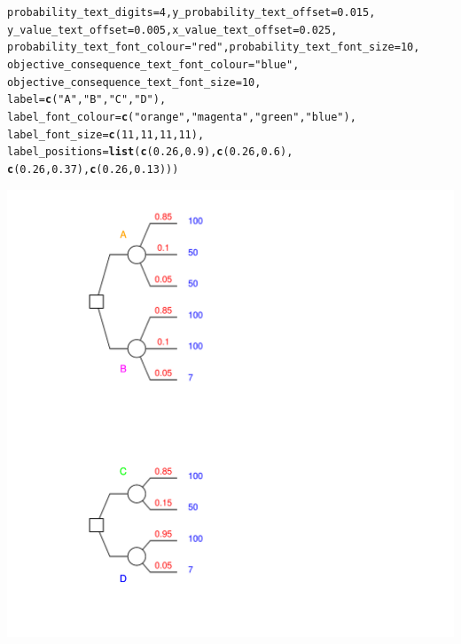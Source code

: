 \documentclass{article}\usepackage[]{graphicx}\usepackage[]{color}
\makeatletter
\newcommand{\hlnum}[1]{\textcolor[rgb]{0.686,0.059,0.569}{#1}}%
\newcommand{\hlstr}[1]{\textcolor[rgb]{0.192,0.494,0.8}{#1}}%
\newcommand{\hlstd}[1]{\textcolor[rgb]{0.345,0.345,0.345}{#1}}%
\newcommand{\hlkwc}[1]{\textcolor[rgb]{0.333,0.667,0.333}{#1}}%
\newcommand{\hlkwd}[1]{\textcolor[rgb]{0.737,0.353,0.396}{\textbf{#1}}}%
\newenvironment{kframe}{%
 \def\at@end@of@kframe{}%
 \ifinner\ifhmode%
  \def\at@end@of@kframe{\end{minipage}}%
  \begin{minipage}{\columnwidth}%
 \fi\fi%
 \def\FrameCommand##1{\hskip\@totalleftmargin \hskip-\fboxsep
 \colorbox{shadecolor}{##1}\hskip-\fboxsep
     \hskip-\linewidth \hskip-\@totalleftmargin \hskip\columnwidth}%
 \MakeFramed {\advance\hsize-\width
   \@totalleftmargin\z@ \linewidth\hsize
   \@setminipage}}%
 {\par\unskip\endMakeFramed%
 \at@end@of@kframe}
\newenvironment{knitrout}{}{} %
\makeatother
\begin{document}
\begin{knitrout}
\begin{kframe}
\begin{alltt}
        \hlkwc{probability_text_digits}\hlstd{=}\hlnum{4}\hlstd{,} \hlkwc{y_probability_text_offset}\hlstd{=}\hlnum{0.015}\hlstd{,}
        \hlkwc{y_value_text_offset}\hlstd{=}\hlnum{0.005}\hlstd{,} \hlkwc{x_value_text_offset}\hlstd{=}\hlnum{0.025}\hlstd{,}
        \hlkwc{probability_text_font_colour}\hlstd{=}\hlstr{"red"}\hlstd{,} \hlkwc{probability_text_font_size}\hlstd{=}\hlnum{10}\hlstd{,}
        \hlkwc{objective_consequence_text_font_colour}\hlstd{=}\hlstr{"blue"}\hlstd{,}
        \hlkwc{objective_consequence_text_font_size}\hlstd{=}\hlnum{10}\hlstd{,}
        \hlkwc{label}\hlstd{=}\hlkwd{c}\hlstd{(}\hlstr{"A"}\hlstd{,}\hlstr{"B"}\hlstd{,}\hlstr{"C"}\hlstd{,}\hlstr{"D"}\hlstd{),}
        \hlkwc{label_font_colour}\hlstd{=}\hlkwd{c}\hlstd{(}\hlstr{"orange"}\hlstd{,}\hlstr{"magenta"}\hlstd{,}\hlstr{"green"}\hlstd{,}\hlstr{"blue"}\hlstd{),}
        \hlkwc{label_font_size}\hlstd{=}\hlkwd{c}\hlstd{(}\hlnum{11}\hlstd{,}\hlnum{11}\hlstd{,}\hlnum{11}\hlstd{,}\hlnum{11}\hlstd{),}
        \hlkwc{label_positions}\hlstd{=}\hlkwd{list}\hlstd{(}\hlkwd{c}\hlstd{(}\hlnum{0.26}\hlstd{,}\hlnum{0.9}\hlstd{),}\hlkwd{c}\hlstd{(}\hlnum{0.26}\hlstd{,}\hlnum{0.6}\hlstd{),}
                \hlkwd{c}\hlstd{(}\hlnum{0.26}\hlstd{,}\hlnum{0.37}\hlstd{),}\hlkwd{c}\hlstd{(}\hlnum{0.26}\hlstd{,}\hlnum{0.13}\hlstd{)))}
\end{alltt}
\end{kframe}

{\centering \includegraphics[width=0.8\linewidth]{figure/unnamed-chunk-46} 

}



\end{knitrout}
\end{document}
